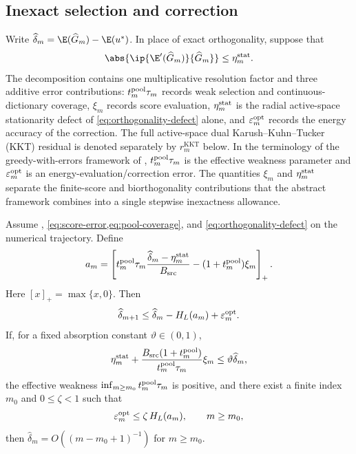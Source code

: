 \subsection{Inexact selection and correction}

Write \(\widehat\delta_m=\E(\widehat G_m)-\E(u^*)\). In place of exact orthogonality, suppose that
\begin{equation}
  \abs{\ip{\E'(\widehat G_m)}{\widehat G_m}}\leq\eta_m^{\rm stat}.
  \label{eq:orthogonality-defect}
\end{equation}
The decomposition contains one multiplicative resolution factor and three additive error
contributions: \(t_m^{\rm pool}\tau_m\) records weak selection and continuous-dictionary coverage,
\(\xi_m\) records score evaluation, \(\eta_m^{\rm stat}\) is the radial active-space stationarity
defect of \cref{eq:orthogonality-defect} alone, and \(\varepsilon_m^{\rm opt}\) records the energy
accuracy of the correction. The full active-space dual Karush--Kuhn--Tucker (KKT) residual is
denoted separately by \(r_m^{\mathrm{KKT}}\) below. In the terminology of the greedy-with-errors
framework of \cite[Section~3]{DereventsovTemlyakov2022}, \(t_m^{\rm pool}\tau_m\) is the effective
weakness parameter and \(\varepsilon_m^{\rm opt}\) is an energy-evaluation/correction error. The
quantities \(\xi_m\) and \(\eta_m^{\rm stat}\) separate the finite-score and biorthogonality
contributions that the abstract framework combines into a single stepwise inexactness allowance.

\begin{theorem}
\label{thm:inexact}
Assume , \cref{eq:score-error,eq:pool-coverage}, and
\cref{eq:orthogonality-defect} on the numerical trajectory. Define
\[
 a_m=\left[
 t_m^{\rm pool}\tau_m\frac{\widehat\delta_m-\eta_m^{\rm stat}}{B_{\rm src}}
 -(1+t_m^{\rm pool})\xi_m
 \right]_+.
\]
Here \([x]_+=\max\{x,0\}\).
Then
\begin{equation}
 \widehat\delta_{m+1}\leq\widehat\delta_m-H_L(a_m)+\varepsilon_m^{\rm opt}.
 \label{eq:inexact-descent}
\end{equation}
If, for a fixed absorption constant \(\vartheta\in(0,1)\),
\begin{equation}
 \eta_m^{\rm stat}+\frac{B_{\rm src}(1+t_m^{\rm pool})}{t_m^{\rm pool}\tau_m}\xi_m
 \leq\vartheta\widehat\delta_m,
 \label{eq:relative-defect}
\end{equation}
the effective weakness \(\inf_{m\ge m_0} t_m^{\rm pool}\tau_m\) is positive, and there
exist a finite index \(m_0\) and \(0\leq\zeta<1\) such that
\[
  \varepsilon_m^{\rm opt}\leq\zeta\,H_L(a_m),\qquad m\ge m_0,
\]
then \(\widehat\delta_m=O((m-m_0+1)^{-1})\) for \(m\ge m_0\).
\end{theorem}

